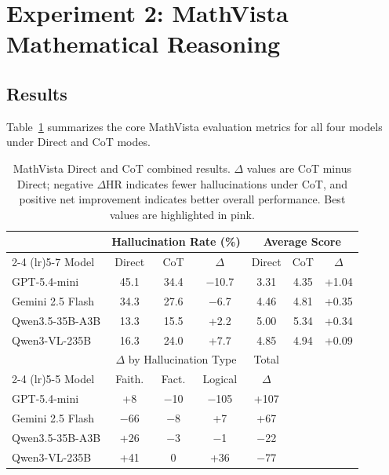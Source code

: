 \newpage
\section{Experiment 2: MathVista Mathematical Reasoning}
\label{sec:mathvista}

\subsection{Results}

Table~\ref{tab:mathvista_combined} summarizes the core MathVista
evaluation metrics for all four models under Direct and CoT modes.

\begin{table}[htbp]
  \centering
  \caption{MathVista Direct and CoT combined results.
    $\Delta$ values are CoT minus Direct;
    negative $\Delta$HR indicates fewer hallucinations under CoT,
    and positive net improvement indicates better overall performance.
    Best values are highlighted in pink.}
  \label{tab:mathvista_combined}
  \small
  \setlength{\tabcolsep}{9pt}
  \begin{tabular}{l ccc ccc}
    \toprule
    & \multicolumn{3}{c}{Hallucination Rate (\%)} & \multicolumn{3}{c}{Average Score} \\
    \cmidrule(lr){2-4} \cmidrule(lr){5-7}
    Model & Direct & CoT & $\Delta$ & Direct & CoT & $\Delta$ \\
    \midrule
    GPT-5.4-mini     & 45.1 & 34.4 & \cellcolor{pink!25}$-$10.7 & 3.31 & 4.35 & +1.04 \\
    Gemini 2.5 Flash & 34.3 & 27.6 & \cellcolor{pink!25}$-$6.7  & 4.46 & 4.81 & +0.35 \\
    Qwen3.5-35B-A3B  & 13.3 & 15.5 & +2.2                         & 5.00 & 5.34 & +0.34 \\
    Qwen3-VL-235B    & 16.3 & 24.0 & +7.7                         & 4.85 & 4.94 & +0.09 \\
    \midrule
    & \multicolumn{3}{c}{$\Delta$ by Hallucination Type} & \multicolumn{1}{c}{Total} \\
    \cmidrule(lr){2-4} \cmidrule(lr){5-5}
    Model & Faith. & Fact. & Logical & $\Delta$ \\
    \midrule
    GPT-5.4-mini     & +8   & $-$10 & $-$105 & +107 \\
    Gemini 2.5 Flash & $-$66 & $-$8  & +7     & +67  \\
    Qwen3.5-35B-A3B  & +26  & $-$3  & $-$1   & $-$22 \\
    Qwen3-VL-235B    & +41  & 0     & +36    & $-$77 \\
    \bottomrule
  \end{tabular}
\end{table}

